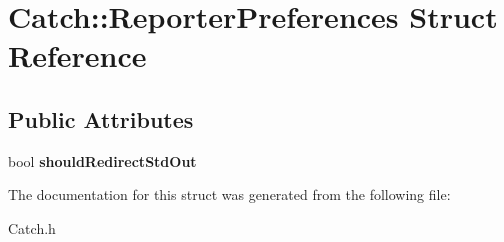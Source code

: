\hypertarget{struct_catch_1_1_reporter_preferences}{\section{Catch\-:\-:Reporter\-Preferences Struct Reference}
\label{struct_catch_1_1_reporter_preferences}
}
\subsection*{Public Attributes}
\begin{DoxyCompactItemize}
\item 
\hypertarget{struct_catch_1_1_reporter_preferences_a434511c4080edbbc12e0d1c31ea14769}{bool {\bfseries should\-Redirect\-Std\-Out}}\label{struct_catch_1_1_reporter_preferences_a434511c4080edbbc12e0d1c31ea14769}

\end{DoxyCompactItemize}


The documentation for this struct was generated from the following file\-:\begin{DoxyCompactItemize}
\item 
Catch.\-h\end{DoxyCompactItemize}
